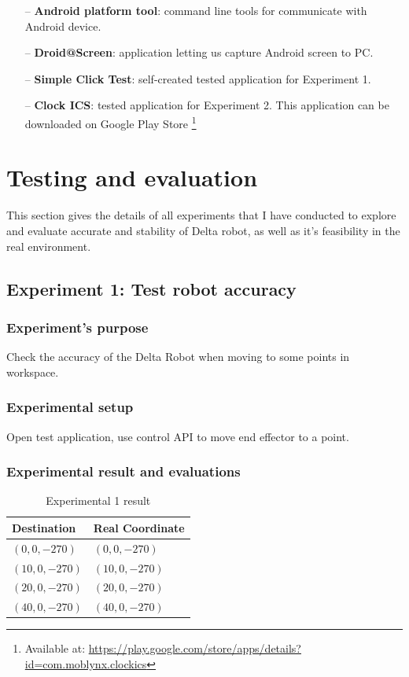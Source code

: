 	\begin{itemize}
		\item[--] \textbf{Android platform tool}: command line tools for communicate with Android device.
		\item[--] \textbf{Droid@Screen}: application letting us capture Android screen to PC.
		\item[--] \textbf{Simple Click Test}: self-created tested application for Experiment 1.
		\item[--] \textbf{Clock ICS}: tested application for Experiment 2. This application can be downloaded on Google Play Store \footnote{Available at: \url{https://play.google.com/store/apps/details?id=com.moblynx.clockics}}
	\end{itemize}



\section{Testing and evaluation}

This section gives the details of all experiments that I have conducted to explore and evaluate accurate and stability of Delta robot, as well as it's feasibility in the real environment.

\subsection{Experiment 1: Test robot accuracy}
\subsubsection{Experiment's purpose}
Check the accuracy of the Delta Robot when moving to some points in workspace.
\subsubsection{Experimental setup}
Open test application, use control API to move end effector to a point.
\subsubsection{Experimental result and evaluations}
\begin{table}[H]
	\centering
	\caption{Experimental 1 result}	
	\label{tab:experiment_1}
	\begin{tabularx}{0.65\textwidth}{l|l}
		\toprule
		\textbf{Destination}	& \textbf{Real Coordinate} \\
		\midrule 
		$(0,0,-270)$			& $(0,0,-270)$ \\
		\midrule 
		$(10,0,-270)$			& $(10,0,-270)$ \\
		\midrule
		$(20,0,-270)$			& $(20,0,-270)$ \\ 
		\midrule
		$(40,0,-270)$			& $(40,0,-270)$ \\ 
		\midrule
		\bottomrule
	\end{tabularx}
\end{table}


